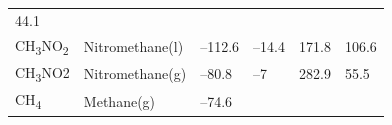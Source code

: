 \documentclass[
  9pt,
]{extbook}
\theoremstyle{definition}
\theoremstyle{definition}
\theoremstyle{definition}
\theoremstyle{remark}
\begin{document}
\begin{longtable}[]{@{}llllll@{}}
\begin{minipage}[t]{0.14\columnwidth}
44.1\strut
\end{minipage}\tabularnewline
\begin{minipage}[t]{0.07\columnwidth}\raggedright
CH\textsubscript{3}NO\textsubscript{2}\strut
\end{minipage} & \begin{minipage}[t]{0.17\columnwidth}\raggedright
Nitromethane(l)\strut
\end{minipage} & \begin{minipage}[t]{0.15\columnwidth}\raggedright
--112.6\strut
\end{minipage} & \begin{minipage}[t]{0.15\columnwidth}\raggedright
--14.4\strut
\end{minipage} & \begin{minipage}[t]{0.14\columnwidth}\raggedright
171.8\strut
\end{minipage} & \begin{minipage}[t]{0.14\columnwidth}\raggedright
106.6\strut
\end{minipage}\tabularnewline
\begin{minipage}[t]{0.07\columnwidth}\raggedright
CH\textsubscript{3}NO2\strut
\end{minipage} & \begin{minipage}[t]{0.17\columnwidth}\raggedright
Nitromethane(g)\strut
\end{minipage} & \begin{minipage}[t]{0.15\columnwidth}\raggedright
--80.8\strut
\end{minipage} & \begin{minipage}[t]{0.15\columnwidth}\raggedright
--7\strut
\end{minipage} & \begin{minipage}[t]{0.14\columnwidth}\raggedright
282.9\strut
\end{minipage} & \begin{minipage}[t]{0.14\columnwidth}\raggedright
55.5\strut
\end{minipage}\tabularnewline
\begin{minipage}[t]{0.07\columnwidth}\raggedright
CH\textsubscript{4}\strut
\end{minipage} & \begin{minipage}[t]{0.17\columnwidth}\raggedright
Methane(g)\strut
\end{minipage} & \begin{minipage}[t]{0.15\columnwidth}\raggedright
--74.6\strut
\end{minipage} & \begin{minipage}[t]{0.15\columnwidth}\raggedright

\end{minipage}
\end{longtable}
\end{document}
